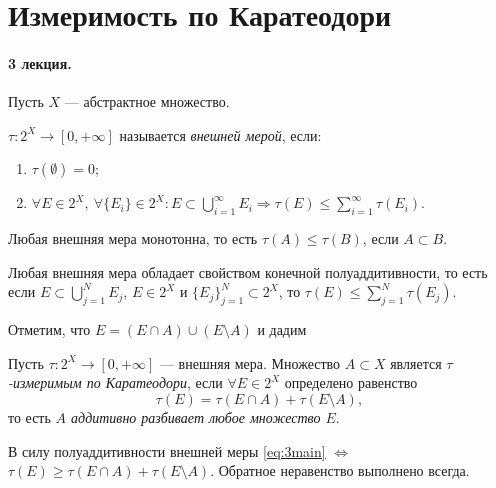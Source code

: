 \section{Измеримость по Каратеодори}
\paragraph{3 лекция.}

\begin{definition}
    Пусть $X$ — абстрактное множество.
    
    \noindent$\tau: 2^X \to [0, + \infty]$ называется \textit{внешней мерой}, если:
    \begin{enumerate}
        \item $\tau(\emptyset) = 0$;
        \item $\forall E \in 2^X, \ \forall \{E_i\} \in 2^X: E \subset \bigcup\limits_{i=1}^{\infty} E_i \Longrightarrow \tau(E) \leqslant \sum\limits_{i=1}^{\infty} \tau(E_i)$.
    \end{enumerate}
\end{definition} 

\begin{corollary}
    Любая внешняя мера монотонна, то есть $\tau(A) \leqslant \tau(B)$, если $A \subset B$.
\end{corollary}

\begin{corollary}
    Любая внешняя мера обладает свойством конечной полуаддитивности, то есть если $E \subset \bigcup\limits_{j=1}^{N} E_j$, $E \in 2^X$ и $\{E_j\}_{j=1}^N \subset 2^X$, то $\tau(E) \leqslant \sum\limits_{j=1}^{N} \tau(E_j)$.
\end{corollary}

Отметим, что $E = (E \cap A) \cup (E \setminus A)$ и дадим

\begin{definition}
    Пусть $\tau: 2^X \to [0, + \infty]$ — внешняя мера.
    Множество $A \subset X$ является \textit{$\tau$-измеримым по Каратеодори}, если $\forall E \in 2^X$ определено равенство
    \begin{equation}
        \tau(E) = \tau(E \cap A) + \tau(E \setminus A), \label{eq:3main}
    \end{equation}
    то есть \textit{$A$ аддитивно разбивает любое множество $E$}.
\end{definition} 

\begin{remark}
    В силу полуаддитивности внешней меры \eqref{eq:3main} $\Longleftrightarrow$ $\tau(E) \geqslant \tau(E \cap A) + \tau(E \setminus A)$. Обратное неравенство выполнено всегда.
\end{remark}


